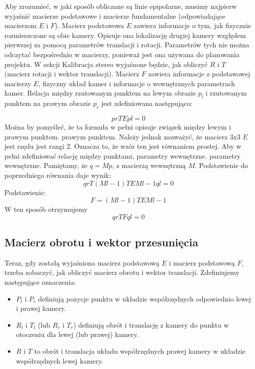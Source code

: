 \documentclass[magisterska]{pracadypl}
\begin{document}
Aby zrozumieć, w jaki sposób obliczane są linie epipolarne, musimy najpierw wyjaśnić macierze podstawowe
i macierze fundamentalne (odpowiadające macierzom $E$ i $F$).
Macierz podstawowa $E$ zawiera informacje o tym, jak fizycznie rozmieszczone są obie kamery.
Opisuje ona lokalizację drugiej kamery względem pierwszej za pomocą parametrów translacji i rotacji.
Parametrów tych nie można odczytać bezpośrednio w macierzy, ponieważ jest ona używana do planowania projektu. W sekcji Kalibracja stereo wyjaśnone będzie, jak obliczyć $R$ i $T$ (macierz rotacji i wektor translacji).
Macierz $F$ zawiera informacje z podstawowej macierzy $E$, fizyczny układ kamer i informacje o wewnętrznych parametrach kamer.
Relacja między rzutowanym punktem na lewym obrazie $p_l$ i rzutowanym punktem na prawym obrazie $p_r$ jest zdefiniowana następująco:

\[prTEpl=0\]
Można by pomyśleć, że ta formuła w pełni opisuje związek między lewym i prawym punktem.
prawym punktem. Należy jednak zauważyć, że macierz 3x3 $E$ jest rzędu
jest rangi 2. Oznacza to, że wzór ten jest równaniem prostej.
Aby w pełni zdefiniować relację między punktami, parametry wewnętrzne.
parametry wewnętrzne.
Pamiętamy, że $q = Mp$, z macierzą wewnętrzną $M$.
Podstawienie do poprzedniego równania daje wynik:
\[qrT(Ml-1)TEMl-1ql=0\]
Podstawienie:\\
\[F=(Ml-1)TEMl-1\]
W ten sposób otrzymujemy\\
\[qrTFql=0\]

\subsection{Macierz obrotu i wektor przesunięcia}

Teraz, gdy zostałą wyjaśniona macierz podstawową $E$ i macierz podstawową $F$, trzeba zobaczyć, jak obliczyć macierz obrotu i wektor translacji.
Zdefiniujemy następujące oznaczenia:

\begin{itemize}
  \item $P_l$ i $P_r$ definiują pozycje punktu w układzie współrzędnych odpowiednio lewej i prawej kamery.
  \item $R_l$ i $T_l$ (lub $R_r$ i $T_r$) definiują obrót i translację z kamery
do punktu w otoczeniu dla lewej (lub prawej) kamery.
  \item $R$ i $T$ to obrót i translacja układu współrzędnych prawej kamery w układzie współrzędnych lewej kamery.
\end{itemize}
\end{document}
